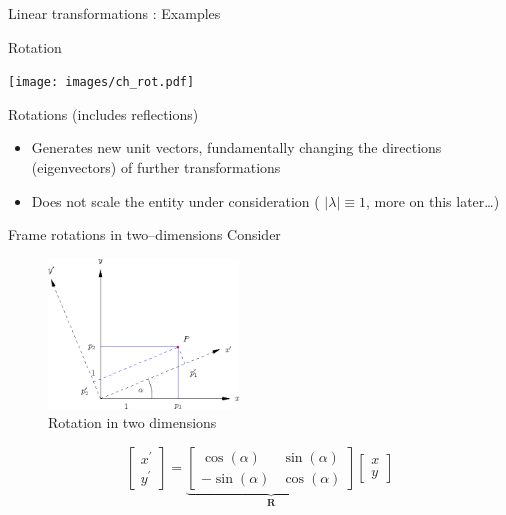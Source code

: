 \documentclass[presentation]{beamer}
\newcommand{\bv}[1]{\ensuremath{\mathbf{#1}}}
\newcommand{\abs}[1]{\left\lvert#1\right\rvert}
\begin{document}
\begin{frame}[label={sec:org1ae9dcc}]{Linear transformations : Examples}
\begin{block}{Rotation}
\begin{center}
\spot<2>{\( \bv{M} =\begin{bmatrix}\cos(\theta )&\sin(\theta )&0\\-\sin(\theta
 )&\cos(\theta )&0\\0&0&1\end{bmatrix} \text{with } \theta = \frac{\pi}{6}\)}
\end{center}

\begin{center}
\texttt{[image: images/ch\_rot.pdf]}
\end{center}
\end{block}
\end{frame}
\begin{frame}[label={sec:orgb876c85}]{Rotations (includes reflections)}
\begin{itemize}
\item Generates new unit vectors, fundamentally changing the directions
(eigenvectors) of further transformations
\item Does not scale the entity under consideration ( \(\abs{\lambda} \equiv  1\), more on this later\ldots{})
\end{itemize}
\end{frame}
\begin{frame}[label={sec:orgc049475}]{Frame rotations in two--dimensions}
Consider
\begin{figure}[htbp]
\centering
\includegraphics[width=0.45\textwidth]{images/cartesian_rotation.png}
\caption{Rotation in two dimensions}
\end{figure}

\[ \begin{bmatrix} x^\prime \\ y^\prime \end{bmatrix}
   = \underbrace{\begin{bmatrix}\cos(\alpha )&\sin(\alpha )\\ -\sin(\alpha
   )&\cos(\alpha )\end{bmatrix}}_{\bv{R}} \begin{bmatrix} x\\ y\end{bmatrix}\]
\end{frame}
\end{document}
